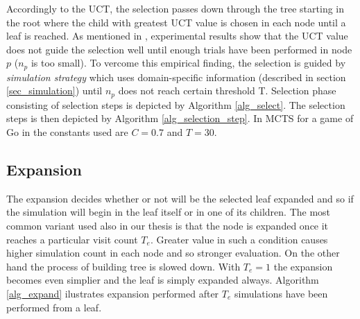Accordingly to the UCT, the selection passes down through the tree starting in the
root where the child with greatest UCT value is chosen in each node until a leaf is reached.
As mentioned in \cite{Chaslot2008}, experimental results show that the UCT value does not 
guide the selection well until
enough trials have been performed in node $p$ ($n_p$ is too small). To vercome this empirical
finding, the selection is guided by \emph{simulation strategy} which uses domain-specific
information (described in section
\ref{sec_simulation}) until $n_p$ does not reach certain threshold T. Selection phase
consisting of selection steps is
depicted by Algorithm \ref{alg_select}. The selection steps is then depicted by Algorithm
\ref{alg_selection_step}. In MCTS for a game of Go in \cite{Chaslot2008} the constants used
are $C= 0.7$ and $T=30$.




\subsection{Expansion}
\label{sec_expansion}


\begin{algorithm}
\DontPrintSemicolon
\caption{$Expand(node)$\label{alg_expand}}
\end{algorithm}

The expansion decides whether or not will be the selected leaf expanded and so if the simulation
will begin in the leaf itself or in one of its children. The most common variant used also in our
thesis is that the node is
expanded once it reaches a particular visit count $T_e$. Greater value in such a condition causes higher
simulation count in each node and so stronger evaluation. On the other hand the process of building
tree is slowed down. With $T_e=1$ the expansion becomes even simplier and the leaf is simply
expanded always. Algorithm \ref{alg_expand} ilustrates expansion performed after $T_e$
simulations have been performed from a leaf.


